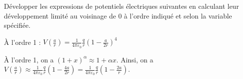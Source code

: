 \finEntrainement



\newpage



\hauteurLargeurCadreReponse		{8mm}{5cm}
\typeEntrainement				{} %
\initialisationEntrainement

Développer les expressions de potentiels électriques suivantes en calculant leur développement limité au voisinage de 0 à l'ordre indiqué et selon la variable spécifiée.

\debutEntrainement


\begin{enonce}
	À l'ordre 1 : $V\left(\frac{a}{r}\right) = \frac{1}{4\pi\varepsilon_0} \frac{q}{r} \left( 1 - \frac{a}{2r}\right)^{4}$
\end{enonce}


\begin{corrige}
	À l'ordre 1, on a  $\left(1+x\right)^{\alpha} \approx  1 + \alpha x$. Ainsi, on a  
	$
		V\left(\frac{a}{r}\right) \approx \frac{1}{4\pi\varepsilon_0} \frac{q}{r} \left( 1 - \frac{4a}{2r}\right) = \frac{1}{4\pi\varepsilon_0} \frac{q}{r}\left( 1 - \frac{2a}{r}\right)
	$.
\end{corrige}




